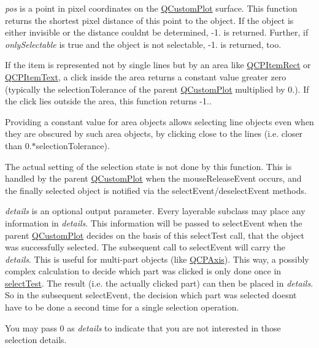 {\itshape pos} is a point in pixel coordinates on the \hyperlink{class_q_custom_plot}{Q\+Custom\+Plot} surface. This function returns the shortest pixel distance of this point to the object. If the object is either invisible or the distance couldn\textquotesingle{}t be determined, -\/1. is returned. Further, if {\itshape only\+Selectable} is true and the object is not selectable, -\/1. is returned, too.

If the item is represented not by single lines but by an area like \hyperlink{class_q_c_p_item_rect}{Q\+C\+P\+Item\+Rect} or \hyperlink{class_q_c_p_item_text}{Q\+C\+P\+Item\+Text}, a click inside the area returns a constant value greater zero (typically the selection\+Tolerance of the parent \hyperlink{class_q_custom_plot}{Q\+Custom\+Plot} multiplied by 0.). If the click lies outside the area, this function returns -\/1..

Providing a constant value for area objects allows selecting line objects even when they are obscured by such area objects, by clicking close to the lines (i.\+e. closer than 0.$\ast$selection\+Tolerance).

The actual setting of the selection state is not done by this function. This is handled by the parent \hyperlink{class_q_custom_plot}{Q\+Custom\+Plot} when the mouse\+Release\+Event occurs, and the finally selected object is notified via the select\+Event/deselect\+Event methods.

{\itshape details} is an optional output parameter. Every layerable subclass may place any information in {\itshape details}. This information will be passed to select\+Event when the parent \hyperlink{class_q_custom_plot}{Q\+Custom\+Plot} decides on the basis of this select\+Test call, that the object was successfully selected. The subsequent call to select\+Event will carry the {\itshape details}. This is useful for multi-\/part objects (like \hyperlink{class_q_c_p_axis}{Q\+C\+P\+Axis}). This way, a possibly complex calculation to decide which part was clicked is only done once in \hyperlink{class_q_c_p_item_curve_a741375c11667b5f9c95b2683f93ee514}{select\+Test}. The result (i.\+e. the actually clicked part) can then be placed in {\itshape details}. So in the subsequent select\+Event, the decision which part was selected doesn\textquotesingle{}t have to be done a second time for a single selection operation.

You may pass 0 as {\itshape details} to indicate that you are not interested in those selection details.

